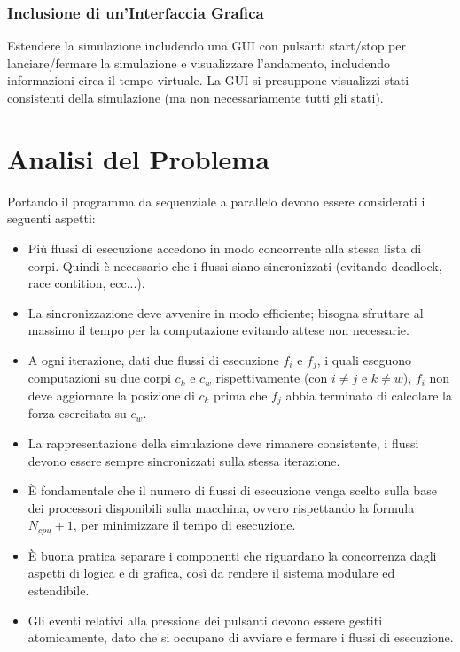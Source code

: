 \documentclass[12pt,a4paper,openright,twoside]{book}
\begin{document}
\subsection{Inclusione di un'Interfaccia Grafica}
Estendere la simulazione includendo una GUI con pulsanti start/stop per lanciare/fermare la simulazione e visualizzare l'andamento,
includendo informazioni circa il tempo virtuale.
La GUI si presuppone visualizzi stati consistenti della simulazione (ma non necessariamente tutti gli stati).
\chapter{Analisi del Problema}
\label{chap:Analisi del Problema}
Portando il programma da sequenziale a parallelo devono essere considerati i seguenti aspetti:
\begin{itemize}
	\item Più flussi di esecuzione accedono in modo concorrente alla stessa lista di corpi.
	Quindi è necessario che i flussi siano sincronizzati (evitando deadlock, race contition, ecc...).
	\item La sincronizzazione deve avvenire in modo efficiente; bisogna sfruttare al massimo il tempo per
	la computazione evitando attese non necessarie.
	\item A ogni iterazione, dati due flussi di esecuzione $f_{i}$ e $f_{j}$, i quali eseguono computazioni su due corpi $c_{k}$ e $c_{w}$ rispettivamente (con $i \neq j$ e $k \neq w$),
	$f_{i}$ non deve aggiornare la posizione di $c_{k}$ prima che $f_{j}$ abbia terminato di calcolare la forza esercitata su $c_{w}$.
	\item La rappresentazione della simulazione deve rimanere
	consistente, i flussi devono essere sempre sincronizzati sulla
	stessa iterazione.
	\item È fondamentale che il numero di flussi di esecuzione venga scelto sulla base dei processori disponibili sulla macchina, ovvero
	rispettando la formula $N_{cpu} + 1$, per minimizzare il tempo di esecuzione.
	\item È buona pratica separare i componenti che riguardano la concorrenza dagli aspetti di logica e di grafica,
	così da rendere il sistema modulare ed estendibile.
	\item Gli eventi relativi alla pressione dei pulsanti
	devono essere gestiti atomicamente, dato che si occupano di
	avviare e fermare i flussi di esecuzione.
\end{itemize}
\end{document}
